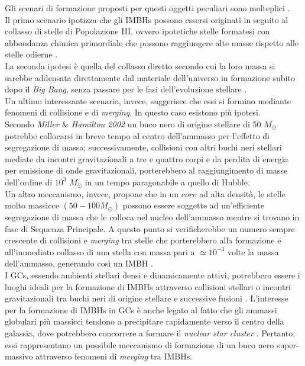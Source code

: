 Gli scenari di formazione proposti per questi oggetti peculiari sono molteplici \cite{jenny:paper}.\\
Il primo scenario ipotizza che gli IMBHs possono essersi originati in seguito al collasso di stelle di Popolazione III, ovvero ipotetiche stelle formatesi con abbondanza chimica primordiale che possono raggiungere alte masse rispetto alle stelle odierne \cite{abel:paper}.\\
La seconda ipotesi è quella del collasso diretto secondo cui la loro massa si sarebbe addensata direttamente dal materiale dell’universo in formazione subito dopo il \textit{Big Bang}, senza passare per le fasi dell'evoluzione stellare \cite{haehnelt:paper}.\\
Un ultimo interessante scenario, invece, suggerisce che essi si formino mediante fenomeni di collisione e di \textit{merging}. In questo caso esistono più ipotesi.\\ 
Secondo \textit{Miller $\&$ Hamilton 2002} \cite{milham:paper} un buco nero di origine stellare di 50 $M_{\odot}$ potrebbe collocarsi in breve tempo al centro dell’ammasso per l'effetto di segregazione di massa; successivamente, collisioni con altri buchi neri stellari mediate da incontri gravitazionali a tre e quattro corpi e da perdita di energia per emissione di onde gravitazionali, porterebbero al raggiungimento di masse dell’ordine di $10^{3}$ $M_{\odot}$ in un tempo paragonabile a quello di Hubble.\\
Un altro meccanismo, invece, propone che in un $core$ ad alta densità, le stelle molto massicce $\left(50-100 M_{\odot}\right)$ possono essere soggette ad un’efficiente segregazione di massa che le colloca nel nucleo dell’ammasso mentre si trovano in fase di Sequenza Principale. A questo punto si verificherebbe un numero sempre crescente di collisioni e \textit{merging} tra stelle che porterebbero alla formazione e all’immediato collasso di una stella con massa pari a $\simeq 10^{-3}$ volte la massa dell'ammasso, generando così un IMBH \cite{portzw:paper}.\\
I GCs, essendo ambienti stellari densi e dinamicamente attivi, potrebbero essere i luoghi ideali per la formazione di IMBHs attraverso collisioni stellari o incontri gravitazionali tra buchi neri  di origine stellare e successive fusioni \cite{portmcmil:paper}. L'interesse per la formazione di IMBHs in GCs è anche legato al fatto che gli ammassi globulari più massicci tendono a precipitare rapidamente verso il centro della galassia, dove potrebbero concorrere a formare il \textit{nuclear star cluster} \cite{arcasedda:paper}. Pertanto, essi rappresentano un possibile meccanismo di formazione di un buco nero super-massivo attraverso fenomeni di \textit{merging} tra IMBHs.

